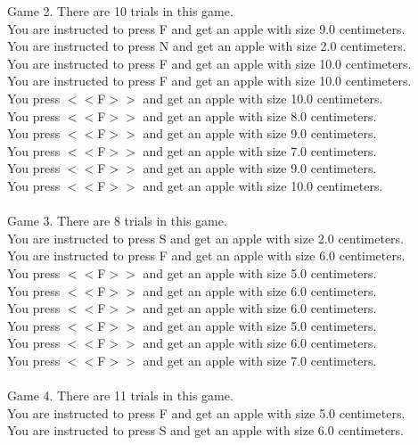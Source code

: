\documentclass[pdflatex,sn-nature]{sn-jnl}%
\theoremstyle{thmstyleone}%
\theoremstyle{thmstyletwo}%
\theoremstyle{thmstylethree}%
\begin{document}
Game 2. There are 10 trials in this game. $~$\\ 
You are instructed to press F and get an apple with size 9.0 centimeters. $~$\\ 
You are instructed to press N and get an apple with size 2.0 centimeters. $~$\\ 
You are instructed to press F and get an apple with size 10.0 centimeters. $~$\\ 
You are instructed to press F and get an apple with size 10.0 centimeters. $~$\\ 
You press $<<$F$>>$ and get an apple with size 10.0 centimeters. $~$\\ 
You press $<<$F$>>$ and get an apple with size 8.0 centimeters. $~$\\ 
You press $<<$F$>>$ and get an apple with size 9.0 centimeters. $~$\\ 
You press $<<$F$>>$ and get an apple with size 7.0 centimeters. $~$\\ 
You press $<<$F$>>$ and get an apple with size 9.0 centimeters. $~$\\ 
You press $<<$F$>>$ and get an apple with size 10.0 centimeters. $~$\\ 
 $~$\\ 
Game 3. There are 8 trials in this game. $~$\\ 
You are instructed to press S and get an apple with size 2.0 centimeters. $~$\\ 
You are instructed to press F and get an apple with size 6.0 centimeters. $~$\\ 
You press $<<$F$>>$ and get an apple with size 5.0 centimeters. $~$\\ 
You press $<<$F$>>$ and get an apple with size 6.0 centimeters. $~$\\ 
You press $<<$F$>>$ and get an apple with size 6.0 centimeters. $~$\\ 
You press $<<$F$>>$ and get an apple with size 5.0 centimeters. $~$\\ 
You press $<<$F$>>$ and get an apple with size 6.0 centimeters. $~$\\ 
You press $<<$F$>>$ and get an apple with size 7.0 centimeters. $~$\\ 
 $~$\\ 
Game 4. There are 11 trials in this game. $~$\\ 
You are instructed to press F and get an apple with size 5.0 centimeters. $~$\\ 
You are instructed to press S and get an apple with size 6.0 centimeters. $~$\\ 
\end{document}
